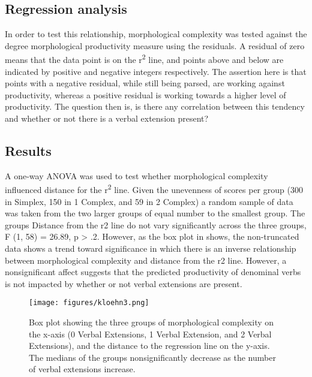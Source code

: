 \documentclass[output=paper,modfonts]{langscibook}
\begin{document}
\subsection{Regression analysis}\label{sec:kloehn:3.1}


In order to test this relationship, morphological complexity was tested against the degree morphological productivity measure using the residuals. A residual of zero means that the data point is on the r\textsuperscript{2} line, and points above and below are indicated by positive and negative integers respectively. The assertion here is that points with a negative residual, while still being parsed, are working against productivity, whereas a positive residual is working towards a higher level of productivity. The question then is, is there any correlation between this tendency and whether or not there is a verbal extension present?

\subsection{Results}\label{sec:kloehn:3.2}

A one-way ANOVA was used to test whether morphological complexity influenced distance for the r\textsuperscript{2} line. Given the unevenness of scores per group (300 in Simplex, 150 in 1 Complex, and 59 in 2 Complex) a random sample of data was taken from the two larger groups of equal number to the smallest group. The groups Distance from the r2 line do not vary significantly across the three groups, F (1, 58) = 26.89, p > .2. However, as the box plot in  shows, the non-truncated data shows a trend toward significance in which there is an inverse relationship between morphological complexity and distance from the r2 line. However, a nonsignificant affect suggests that the predicted productivity of denominal verbs is not impacted by whether or not verbal extensions are present.

   \begin{figure}
\texttt{[image: figures/kloehn3.png]}
\caption{Box plot showing the three groups of morphological complexity on the x-axis (0 Verbal Extensions, 1 Verbal Extension, and 2 Verbal Extensions), and the distance to the regression line on the y-axis. The medians of the groups nonsignificantly decrease as the number of verbal extensions increase.}
\label{fig:kloehn:3}
\end{figure} 
\end{document}
